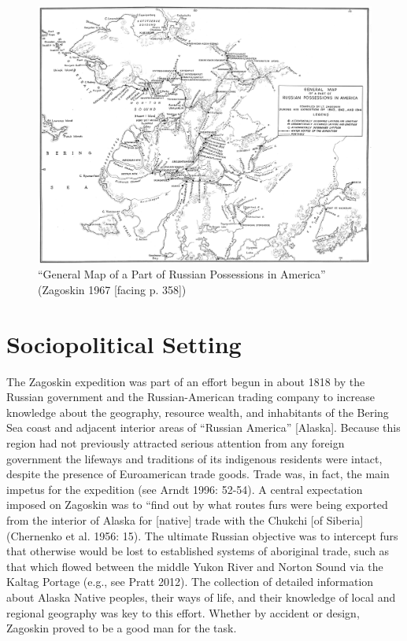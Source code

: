     \begin{figure}[!h]
    \centering
    \includegraphics[width=\textwidth]{figures/pratt-fig2}
    \caption{``General Map of a Part of Russian Possessions in America” (Zagoskin 1967 [facing p. 358])}
    \label{pratt-fig2}
\end{figure}

\section*{Sociopolitical Setting}
The Zagoskin expedition was part of an effort begun in about 1818 by the Russian government and the Russian-American trading company to increase knowledge about the geography, resource wealth, and inhabitants of the Bering Sea coast and adjacent interior areas of “Russian America” [Alaska]. Because this region had not previously attracted serious attention from any foreign government the lifeways and traditions of its indigenous residents were intact, despite the presence of Euroamerican trade goods. Trade was, in fact, the main impetus for the expedition (see Arndt 1996: 52-54). A central expectation imposed on Zagoskin was to “find out by what routes furs were being exported from the interior of Alaska for [native] trade with the Chukchi [of Siberia] (Chernenko et al. 1956: 15). The ultimate Russian objective was to intercept furs that otherwise would be lost to established systems of aboriginal trade, such as that which flowed between the middle Yukon River and Norton Sound via the Kaltag Portage (e.g., see Pratt 2012). The collection of detailed information about Alaska Native peoples, their ways of life, and their knowledge of local and regional geography was key to this effort. Whether by accident or design, Zagoskin proved to be a good man for the task.

